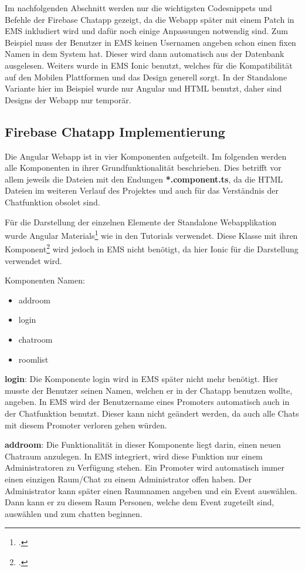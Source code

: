Im nachfolgenden Abschnitt werden nur die wichtigsten Codesnippets und Befehle der Firebase Chatapp gezeigt, da die Webapp später mit einem Patch in EMS inkludiert wird und dafür noch einige Anpassungen notwendig sind.
Zum Beispiel muss der Benutzer in EMS keinen Usernamen angeben schon einen fixen Namen in dem System hat. Dieser wird dann automatisch aus der Datenbank ausgelesen. Weiters wurde in EMS Ionic benutzt, welches für die 
Kompatibilität auf den Mobilen Plattformen und das Design generell sorgt. In der Standalone Variante hier im Beispiel wurde nur Angular und HTML benutzt, daher sind Designs der Webapp nur temporär.

\subsection{Firebase Chatapp Implementierung}
Die Angular Webapp ist in vier Komponenten aufgeteilt. Im folgenden werden alle Komponenten in ihrer Grundfunktionalität beschrieben. Dies betrifft vor allem jeweils die Dateien mit den Endungen \textbf{*.component.ts}, da die 
HTML Dateien im weiteren Verlauf des Projektes und auch für das Verständnis der Chatfunktion obsolet sind.

Für die Darstellung der einzelnen Elemente der Standalone Webapplikation wurde Angular Materials\footcite{materials} wie in den Tutorials verwendet.
Diese Klasse mit ihren Komponent\footcite{matierials-componenten} wird jedoch in EMS nicht benötigt, da hier Ionic für die Darstellung verwendet wird.

Komponenten Namen:
\begin{itemize}
	\item addroom
	\item login
	\item chatroom
	\item roomlist
\end{itemize}

\textbf{login}: Die Komponente login wird in EMS später nicht mehr benötigt. Hier musste der Benutzer seinen Namen, welchen er in der Chatapp benutzen wollte, angeben. In EMS wird der Benutzername eines Promoters automatisch
auch in der Chatfunktion benutzt. Dieser kann nicht geändert werden, da auch alle Chats mit diesem Promoter verloren gehen würden.

\textbf{addroom}: Die Funktionalität in dieser Komponente liegt darin, einen neuen Chatraum anzulegen. In EMS integriert, wird diese Funktion nur einem Administratoren zu
Verfügung stehen. Ein Promoter wird automatisch immer einen einzigen Raum/Chat zu einem Administrator offen haben. Der Administrator kann später einen Raumnamen angeben und ein Event auswählen. Dann kann er zu diesem Raum Personen,
welche dem Event zugeteilt sind, auswählen und zum chatten beginnen.

